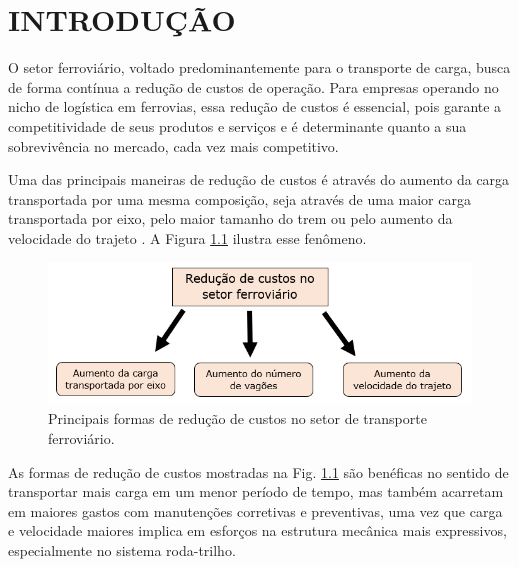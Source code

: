 \documentclass[
12pt,
openany, %
oneside, %
a4paper,			
english,			
brazil			        %
]{abntbibufjf}
\begin{document}
	
	
	\tableofcontents*
	\cleardoublepage
	
	
	
	\textual
	\pagestyle{simple}   
	
	
\chapter{INTRODUÇÃO}  

	O setor ferroviário, voltado predominantemente para o transporte de carga, busca de forma contínua a redução de custos de operação. Para empresas operando no nicho de logística em ferrovias, essa redução de custos é essencial, pois garante a competitividade de seus produtos e serviços e é determinante quanto a sua sobrevivência no mercado, cada vez mais competitivo.
	
	Uma das principais maneiras de redução de custos é através do aumento da carga transportada por uma mesma composição, seja através de uma maior carga transportada por eixo, pelo maior tamanho do trem ou pelo aumento da velocidade do trajeto \cite{alves2000desgaste}. A Figura \ref{fig:reducao_custos} ilustra esse fenômeno.
	
	\begin{figure}[H]
		\centering
		\includegraphics[width=1\textwidth]{reducao_custos}
		\caption{Principais formas de redução de custos no setor de transporte ferroviário.}
		\label{fig:reducao_custos}
	\end{figure}

	As formas de redução de custos mostradas na Fig. \ref{fig:reducao_custos} são benéficas no sentido de transportar mais carga em um menor período de tempo, mas também acarretam em maiores gastos com manutenções corretivas e preventivas, uma vez que carga e velocidade maiores implica em esforços na estrutura mecânica mais expressivos, especialmente no sistema roda-trilho.
\end{document}
